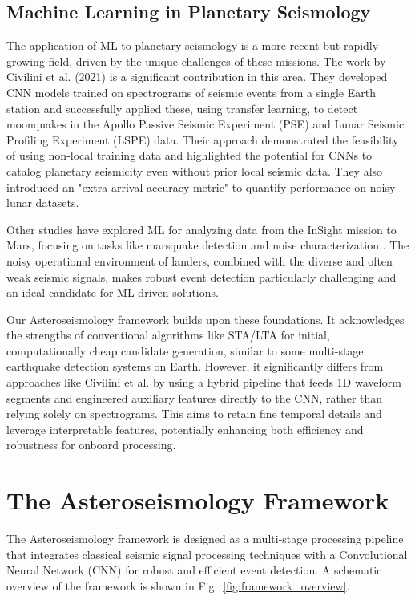 \documentclass[conference]{IEEEtran}
\begin{document}
\subsection{Machine Learning in Planetary Seismology}
The application of ML to planetary seismology is a more recent but rapidly growing field, driven by the unique challenges of these missions. The work by Civilini et al. (2021) \cite{b1} is a significant contribution in this area. They developed CNN models trained on spectrograms of seismic events from a single Earth station and successfully applied these, using transfer learning, to detect moonquakes in the Apollo Passive Seismic Experiment (PSE) and Lunar Seismic Profiling Experiment (LSPE) data. Their approach demonstrated the feasibility of using non-local training data and highlighted the potential for CNNs to catalog planetary seismicity even without prior local seismic data. They also introduced an "extra-arrival accuracy metric" to quantify performance on noisy lunar datasets.

Other studies have explored ML for analyzing data from the InSight mission to Mars, focusing on tasks like marsquake detection and noise characterization \cite{b21}. The noisy operational environment of landers, combined with the diverse and often weak seismic signals, makes robust event detection particularly challenging and an ideal candidate for ML-driven solutions.

Our Asteroseismology framework builds upon these foundations. It acknowledges the strengths of conventional algorithms like STA/LTA for initial, computationally cheap candidate generation, similar to some multi-stage earthquake detection systems on Earth. However, it significantly differs from approaches like Civilini et al. \cite{b1} by using a hybrid pipeline that feeds 1D waveform segments and engineered auxiliary features directly to the CNN, rather than relying solely on spectrograms. This aims to retain fine temporal details and leverage interpretable features, potentially enhancing both efficiency and robustness for onboard processing.

\section{The Asteroseismology Framework}
\label{sec:methodology}
The Asteroseismology framework is designed as a multi-stage processing pipeline that integrates classical seismic signal processing techniques with a Convolutional Neural Network (CNN) for robust and efficient event detection. A schematic overview of the framework is shown in Fig.~\ref{fig:framework_overview}.
\end{document}
